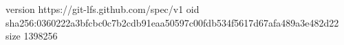 version https://git-lfs.github.com/spec/v1
oid sha256:0360222a3bfcbc0c7b2cdb91eaa50597c00fdb534f5617d67afa489a3e482d22
size 1398256
